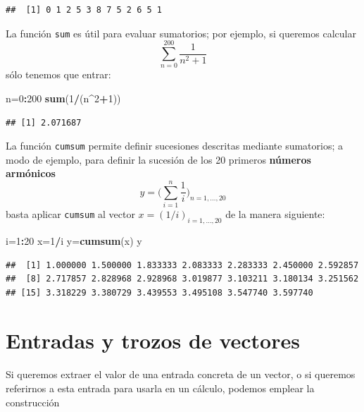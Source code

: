\documentclass[]{book}
\newenvironment{Shaded}{\begin{snugshade}}{\end{snugshade}}
\newcommand{\DecValTok}[1]{\textcolor[rgb]{0.00,0.00,0.81}{#1}}
\newcommand{\KeywordTok}[1]{\textcolor[rgb]{0.13,0.29,0.53}{\textbf{#1}}}
\newcommand{\NormalTok}[1]{#1}
\newcommand{\OperatorTok}[1]{\textcolor[rgb]{0.81,0.36,0.00}{\textbf{#1}}}
\theoremstyle{definition}
\theoremstyle{definition}
\theoremstyle{definition}
\theoremstyle{remark}
\begin{document}
\begin{verbatim}
##  [1] 0 1 2 5 3 8 7 5 2 6 5 1
\end{verbatim}

La función \texttt{sum} es útil para evaluar sumatorios; por ejemplo, si queremos calcular
\[
\sum_{n=0}^{200} \frac{1}{n^2+1}
\]
sólo tenemos que entrar:

\begin{Shaded}
\begin{Highlighting}[]
\NormalTok{n=}\DecValTok{0}\OperatorTok{:}\DecValTok{200}
\KeywordTok{sum}\NormalTok{(}\DecValTok{1}\OperatorTok{/}\NormalTok{(n}\OperatorTok{^}\DecValTok{2}\OperatorTok{+}\DecValTok{1}\NormalTok{))}
\end{Highlighting}
\end{Shaded}

\begin{verbatim}
## [1] 2.071687
\end{verbatim}

La función \texttt{cumsum} permite definir sucesiones descritas mediante sumatorios; a modo de ejemplo, para definir la sucesión de los 20 primeros \textbf{números armónicos}
\[
y=\Big(\sum_{i=1}^n \frac{1}{i}\Big)_{n=1, \ldots, 20}
\]
basta aplicar \texttt{cumsum} al vector \(x=(1/i)_{i=1, \ldots, 20}\) de la manera siguiente:

\begin{Shaded}
\begin{Highlighting}[]
\NormalTok{i=}\DecValTok{1}\OperatorTok{:}\DecValTok{20}
\NormalTok{x=}\DecValTok{1}\OperatorTok{/}\NormalTok{i}
\NormalTok{y=}\KeywordTok{cumsum}\NormalTok{(x)}
\NormalTok{y}
\end{Highlighting}
\end{Shaded}

\begin{verbatim}
##  [1] 1.000000 1.500000 1.833333 2.083333 2.283333 2.450000 2.592857
##  [8] 2.717857 2.828968 2.928968 3.019877 3.103211 3.180134 3.251562
## [15] 3.318229 3.380729 3.439553 3.495108 3.547740 3.597740
\end{verbatim}

\hypertarget{entradas-y-trozos-de-vectores}{%
\section{Entradas y trozos de vectores}\label{entradas-y-trozos-de-vectores}}

Si queremos extraer el valor de una entrada concreta de un vector, o si queremos referirnos a esta entrada para usarla en un cálculo, podemos emplear la construcción
\end{document}
